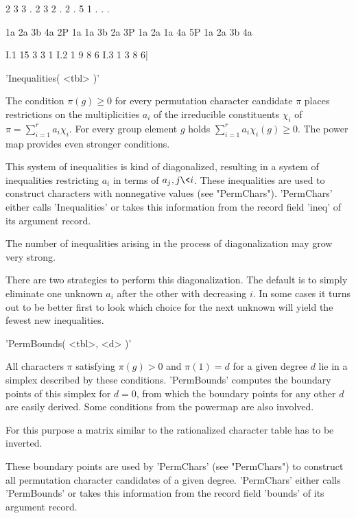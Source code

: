          2  3  3  .  2
         3  2  .  2  .
         5  1  .  .  .

           1a 2a 3b 4a
        2P 1a 1a 3b 2a
        3P 1a 2a 1a 4a
        5P 1a 2a 3b 4a

    I.1    15  3  3  1
    I.2     1  9  8  6
    I.3     1  3  8  6|


'Inequalities( <tbl> )'

The condition  $\pi(g) \geq 0$  for every permutation character candidate
$\pi$ places restrictions on the  multiplicities $a_i$ of the irreducible
constituents  $\chi_i$  of $\pi  =  \sum_{i=1}^r a_i \chi_i$.   For every
group element  $g$ holds $\sum_{i=1}^r a_i \chi_i(g)  \geq 0$.  The power
map provides even stronger conditions.

This   system of inequalities  is  kind  of  diagonalized, resulting in a
system of  inequalities restricting  $a_i$  in  terms of  $a_j, j  \< i$.
These inequalities are  used   to construct characters  with  nonnegative
values (see   "PermChars").  'PermChars' either   calls 'Inequalities' or
takes this  information  from the  record field   'ineq' of its  argument
record.

The number of inequalities arising  in the process of diagonalization may
grow very strong.

There are two strategies to perform  this diagonalization. The default is
to  simply eliminate  one unknown $a_i$  after the  other with decreasing
$i$.  In some cases it turns out to be better  first to look which choice
for the next unknown will yield the fewest new inequalities.


'PermBounds( <tbl>, <d> )'

All characters $\pi$ satisfying $\pi(g) > 0$ and $\pi(1) = d$ for a given
degree $d$ lie  in a simplex described  by these conditions. 'PermBounds'
computes the boundary points of this simplex for  $d = 0$, from which the
boundary points for any other  $d$  are easily derived.  Some  conditions
from the powermap are also involved.

For this purpose a matrix similar to the rationalized character table has
to be inverted.

These boundary  points are used   by  'PermChars' (see  "PermChars")   to
construct  all  permutation  character   candidates  of a  given  degree.
'PermChars' either calls 'PermBounds' or takes  this information from the
record field 'bounds' of its argument record.

